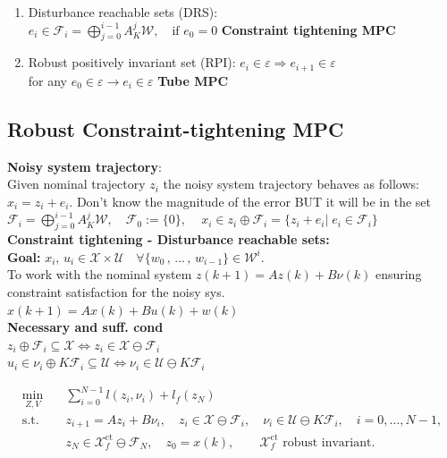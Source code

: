 \begin{enumerate}
    \item Disturbance reachable sets (DRS):\\
    $e_i\in\mathcal{F}_i=\bigoplus_{j=0}^{i-1}A_K^j\mathcal{W},\quad \text{if } e_0=0 $
    \rightarrow \textbf{Constraint tightening MPC}
    \item Robust positively invariant set (RPI):
    $e_i\in\varepsilon\Rightarrow e_{i+1}\in\varepsilon$\\
    for any $e_0\in \varepsilon \rightarrow e_i\in\varepsilon$
    \rightarrow \textbf{Tube MPC}
\end{enumerate}



\subsection{Robust Constraint-tightening MPC}
\textbf{Noisy system trajectory}:\\
Given nominal trajectory $z_i$ the noisy system trajectory behaves as follows:\\
$x_i=z_i+e_i$. Don't know the magnitude of the error BUT it will be in the set $\mathcal{F}_i=\bigoplus_{j=0}^{i-1}A_K^j\mathcal{W},\quad \mathcal{F}_0:=\{0\}$,
$\quad x_i\in z_i\oplus \mathcal{F}_i=\{z_i+e_i|\;e_i\in\mathcal{F}_i\}$\\

\textbf{Constraint tightening - Disturbance reachable sets:}\\
\textbf{Goal:} $x_i,\,u_i\in\mathcal{X}\times\mathcal{U}\quad\forall \{w_0\,,\,...\,,\,w_{i-1}\}\in\mathcal{W}^i$.\\
To work with the nominal system $z(k+1)=Az(k)+B\nu(k)$ ensuring constraint satisfaction for the noisy sys. $x(k+1)=Ax(k)+Bu(k)+w(k)$\\
\textbf{Necessary and suff. cond}\\
$z_i\oplus\mathcal{F}_i\subseteq\mathcal{X}\Leftrightarrow z_i\in\mathcal{X}\ominus\mathcal{F}_i$\\
$u_i\in\nu_i\oplus K\mathcal{F}_i\subseteq\mathcal{U}\Leftrightarrow \nu_i\in\mathcal{U}\ominus K\mathcal{F}_i$\\
\begin{tcolorbox}[eqbox]
\begingroup
\setlength{\jot}{1pt}
\[
\begin{aligned}
\min_{Z,V}\quad
& \sum_{i=0}^{N-1} l(z_i,\nu_i)+l_f(z_N)\\[-1mm]
\text{s.t.}\quad
& z_{i+1}=Az_i+B\nu_i,\quad
  z_i\in\mathcal{X}\ominus\mathcal{F}_i,\quad
  \nu_i\in\mathcal{U}\ominus K\mathcal{F}_i,
  \quad i=0,\ldots,N-1,\\[-1mm]
& z_N\in\mathcal{X}_f^{\mathrm{ct}}\ominus\mathcal{F}_N,\quad
  z_0=x(k),
  \qquad
  \mathcal{X}_f^{\mathrm{ct}}\text{ robust invariant}.
\end{aligned}
\]
\endgroup
\end{tcolorbox}

